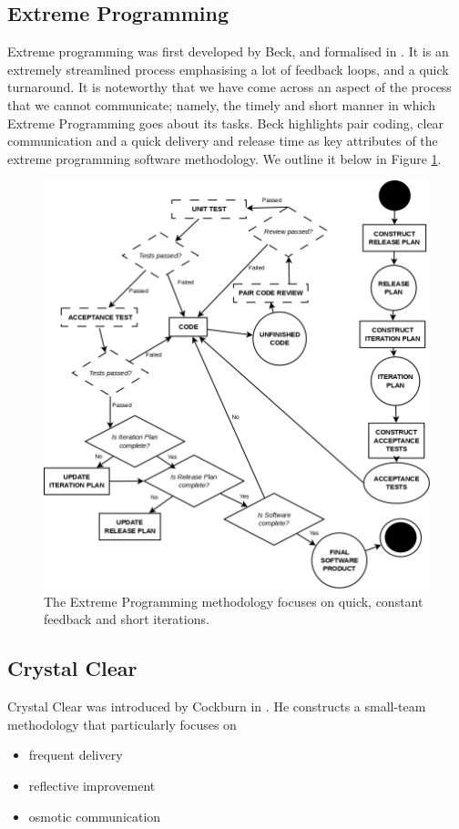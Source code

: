 \subsection{Extreme Programming}
Extreme programming was first developed by Beck, and formalised in \cite{beck2004extreme}.
It is an extremely streamlined process emphasising a lot of feedback loops, and a quick turnaround.
It is noteworthy that we have come across an aspect of the process that we cannot communicate;
namely, the timely and short manner in which Extreme Programming goes about its tasks.
Beck highlights pair coding, clear communication and a quick delivery and release time as key
attributes of the extreme programming software methodology.
We outline it below in Figure \ref{WindowsXP}.

\begin{figure}
	\centering
	\includegraphics[scale=0.3]{media/EXP}
	\caption{The Extreme Programming methodology focuses on quick, constant feedback and short
		iterations.}
	\label{WindowsXP}
\end{figure}

\vfill
\pagebreak

\subsection{Crystal Clear}
Crystal Clear was introduced by Cockburn in \cite{cockburn2004crystal}.
He constructs a small-team methodology that particularly focuses on
\begin{itemize}
	\item frequent delivery
	\item reflective improvement
	\item osmotic communication
\end{itemize}


